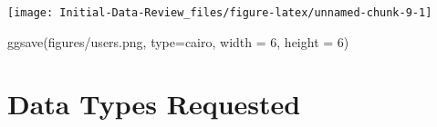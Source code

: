 \documentclass[
]{article}
\newenvironment{Shaded}{\begin{snugshade}}{\end{snugshade}}
\newcommand{\AttributeTok}[1]{\textcolor[rgb]{0.77,0.63,0.00}{#1}}
\newcommand{\CommentTok}[1]{\textcolor[rgb]{0.56,0.35,0.01}{\textit{#1}}}
\newcommand{\ConstantTok}[1]{\textcolor[rgb]{0.00,0.00,0.00}{#1}}
\newcommand{\DecValTok}[1]{\textcolor[rgb]{0.00,0.00,0.81}{#1}}
\newcommand{\FunctionTok}[1]{\textcolor[rgb]{0.00,0.00,0.00}{#1}}
\newcommand{\NormalTok}[1]{#1}
\newcommand{\OtherTok}[1]{\textcolor[rgb]{0.56,0.35,0.01}{#1}}
\newcommand{\SpecialCharTok}[1]{\textcolor[rgb]{0.00,0.00,0.00}{#1}}
\newcommand{\StringTok}[1]{\textcolor[rgb]{0.31,0.60,0.02}{#1}}
\begin{document}
\begin{center}\texttt{[image: Initial-Data-Review\_files/figure-latex/unnamed-chunk-9-1]} \end{center}

\begin{Shaded}
\begin{Highlighting}[]
\FunctionTok{ggsave}\NormalTok{(}\StringTok{\textquotesingle{}figures/users.png\textquotesingle{}}\NormalTok{, }\AttributeTok{type=}\StringTok{\textquotesingle{}cairo\textquotesingle{}}\NormalTok{,}
         \AttributeTok{width =} \DecValTok{6}\NormalTok{, }\AttributeTok{height =} \DecValTok{6}\NormalTok{)}
\end{Highlighting}
\end{Shaded}

\hypertarget{data-types-requested}{%
\section{Data Types Requested}\label{data-types-requested}}

\begin{Shaded}
\end{Shaded}
\end{document}
